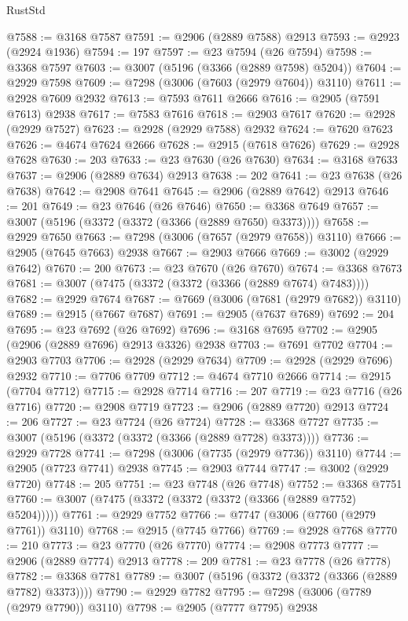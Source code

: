 \begin{lexlean}{RustStd}
\begin{coremodule}
{\begin{coremodule}
{{{{{{{{{{{{{{{{{{{{{{{{{{{{{{{{{{{{{{{{{{{{{{{{{{{{{{{{{{{{{{{{{{{{{{{{{{{{{{@7588 := @3168 @7587
@7591 := @2906 (@2889 @7588) @2913
@7593 := @2923 (@2924 @1936)
@7594 := 197
@7597 := @23 @7594 (@26 @7594)
@7598 := @3368 @7597
@7603 := @3007 (@5196 (@3366 (@2889 @7598) @5204))
@7604 := @2929 @7598
@7609 := @7298 (@3006 (@7603 (@2979 @7604)) @3110)
@7611 := @2928 @7609 @2932
@7613 := @7593 @7611 @2666
@7616 := @2905 (@7591 @7613) @2938
@7617 := @7583 @7616
@7618 := @2903 @7617
@7620 := @2928 (@2929 @7527)
@7623 := @2928 (@2929 @7588) @2932
@7624 := @7620 @7623
@7626 := @4674 @7624 @2666
@7628 := @2915 (@7618 @7626)
@7629 := @2928 @7628
@7630 := 203
@7633 := @23 @7630 (@26 @7630)
@7634 := @3168 @7633
@7637 := @2906 (@2889 @7634) @2913
@7638 := 202
@7641 := @23 @7638 (@26 @7638)
@7642 := @2908 @7641
@7645 := @2906 (@2889 @7642) @2913
@7646 := 201
@7649 := @23 @7646 (@26 @7646)
@7650 := @3368 @7649
@7657 := @3007 (@5196 (@3372 (@3372 (@3366 (@2889 @7650) @3373))))
@7658 := @2929 @7650
@7663 := @7298 (@3006 (@7657 (@2979 @7658)) @3110)
@7666 := @2905 (@7645 @7663) @2938
@7667 := @2903 @7666
@7669 := @3002 (@2929 @7642)
@7670 := 200
@7673 := @23 @7670 (@26 @7670)
@7674 := @3368 @7673
@7681 := @3007 (@7475 (@3372 (@3372 (@3366 (@2889 @7674) @7483))))
@7682 := @2929 @7674
@7687 := @7669 (@3006 (@7681 (@2979 @7682)) @3110)
@7689 := @2915 (@7667 @7687)
@7691 := @2905 (@7637 @7689)
@7692 := 204
@7695 := @23 @7692 (@26 @7692)
@7696 := @3168 @7695
@7702 := @2905 (@2906 (@2889 @7696) @2913 @3326) @2938
@7703 := @7691 @7702
@7704 := @2903 @7703
@7706 := @2928 (@2929 @7634)
@7709 := @2928 (@2929 @7696) @2932
@7710 := @7706 @7709
@7712 := @4674 @7710 @2666
@7714 := @2915 (@7704 @7712)
@7715 := @2928 @7714
@7716 := 207
@7719 := @23 @7716 (@26 @7716)
@7720 := @2908 @7719
@7723 := @2906 (@2889 @7720) @2913
@7724 := 206
@7727 := @23 @7724 (@26 @7724)
@7728 := @3368 @7727
@7735 := @3007 (@5196 (@3372 (@3372 (@3366 (@2889 @7728) @3373))))
@7736 := @2929 @7728
@7741 := @7298 (@3006 (@7735 (@2979 @7736)) @3110)
@7744 := @2905 (@7723 @7741) @2938
@7745 := @2903 @7744
@7747 := @3002 (@2929 @7720)
@7748 := 205
@7751 := @23 @7748 (@26 @7748)
@7752 := @3368 @7751
@7760 := @3007 (@7475 (@3372 (@3372 (@3372 (@3366 (@2889 @7752) @5204)))))
@7761 := @2929 @7752
@7766 := @7747 (@3006 (@7760 (@2979 @7761)) @3110)
@7768 := @2915 (@7745 @7766)
@7769 := @2928 @7768
@7770 := 210
@7773 := @23 @7770 (@26 @7770)
@7774 := @2908 @7773
@7777 := @2906 (@2889 @7774) @2913
@7778 := 209
@7781 := @23 @7778 (@26 @7778)
@7782 := @3368 @7781
@7789 := @3007 (@5196 (@3372 (@3372 (@3366 (@2889 @7782) @3373))))
@7790 := @2929 @7782
@7795 := @7298 (@3006 (@7789 (@2979 @7790)) @3110)
@7798 := @2905 (@7777 @7795) @2938
}}}}}}}}}}}}}}}}}}}}}}}}}}}}}}}}}}}}}}}}}}}}}}}}}}}}}}}}}}}}}}}}}}}}}}}}}}}}}}
\end{coremodule}}
\end{coremodule}
\end{lexlean}
